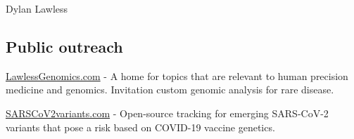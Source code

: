 \documentclass[12pt,a4paper]{article}
\begin{document}
\begin{cv}{Dylan Lawless}

\subsection*{Public outreach}
\href{https://lawlessgenomics.com}{LawlessGenomics.com} - A home for topics that are relevant to human precision medicine and genomics. Invitation custom genomic analysis for rare disease.

\noindent \href{https://sarscov2variants.com}{SARSCoV2variants.com} - Open-source tracking for emerging SARS-CoV-2 variants that pose a risk based on COVID-19 vaccine genetics.


\end{cv}
\end{document}
